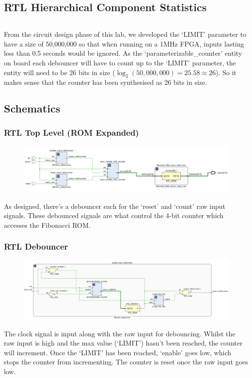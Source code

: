 \documentclass[11pt]{report}
\begin{document}
\subsection*{RTL Hierarchical Component Statistics}
\inputminted[firstline=83,lastline=107]{text}{../../Lab1/Lab1.runs/synth_1/fibonacci_8bit_sequence.vds}

From the circuit design phase of this lab, we developed the `LIMIT' parameter to have a size of 50,000,000 so that when running on a 1MHz FPGA, inputs lasting less than 0.5 seconds would be ignored. As the `parameterizable\_counter' entity on board each debouncer will have to count up to the `LIMIT' parameter, the entity will need to be 26 bits in size ($\log_2(50,000,000)=25.58\approx26$). So it makes sense that the counter has been synthesised as 26 bits in size.



\subsection*{Schematics}


\subsubsection*{RTL Top Level (ROM Expanded)}
\begin{figure}[H]
    \includegraphics[width=\columnwidth]{Reports/Lab1/Schematics/01_rtl-tl-rom-expanded.png}
\end{figure}
As designed, there's a debouncer each for the `reset' and `count' raw input signals. These debounced signals are what control the 4-bit counter which accesses the Fibonacci ROM.



\subsubsection*{RTL Debouncer}
\begin{figure}[H]
    \includegraphics[width=\columnwidth]{Reports/Lab1/Schematics/02_rtl-debouncer.png}
\end{figure}
The clock signal is input along with the raw input for debouncing. Whilst the raw input is high and the max value (`LIMIT') hasn't been reached, the counter will increment. Once the `LIMIT' has been reached, `enable' goes low, which stops the counter from incrementing. The counter is reset once the raw input goes low.
\end{document}
